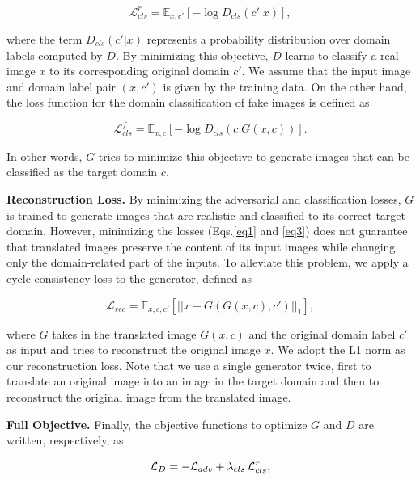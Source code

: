 \begin{equation}
\mathcal{L}_{cls}^{r} = {\mathbb{E}}_{x, c'}[-\log{{D}_{cls}(c'|x)}],
\label{eq2}
\end{equation}

where the term ${D}_{cls}(c'|x)$ represents a probability distribution over domain labels computed by $D$. By minimizing this objective, $D$ learns to classify a real image $x$ to its corresponding original domain $c'$. We assume that the input image and domain label pair $(x, c')$ is given by the training data. On the other hand, the loss function for the domain classification of fake images is defined as

\begin{equation}
\mathcal{L}_{cls}^{f} ={\mathbb{E}}_{x, c}[-\log{{D}_{cls}(c|G(x, c))}].
\label{eq3}
\end{equation}

In other words, $G$ tries to minimize this objective to generate images that can be classified as the target domain $c$. 

\medskip

 \textbf{Reconstruction Loss.} By minimizing the adversarial and classification losses, $G$ is trained to generate images that are realistic and classified to its correct target domain. However, minimizing the losses (Eqs.\thinspace\eqref{eq1} and \eqref{eq3}) does not guarantee that translated images preserve the content of its input images while changing only the domain-related part of the inputs. To alleviate this problem, we apply a cycle consistency loss \cite{kim2017learning, zhu2017unpaired} to the generator, defined as

\begin{equation}
\mathcal{L}_{rec} = {\mathbb{E}}_{x, c, c'} [{||x - G(G(x, c), c')||}_{1} ],
\label{eq4}
\end{equation}

 where $G$ takes in the translated image $G(x, c)$ and the original domain label $c'$ as input and tries to reconstruct the original image $x$. We adopt the L1 norm as our reconstruction loss. Note that we use a single generator twice, first to translate an original image into an image in the target domain and then to reconstruct the original image from the translated image. 

\medskip

 \textbf{Full Objective.} Finally, the objective functions to optimize $G$ and $D$ are written, respectively, as

\begin{equation}
\mathcal{L}_{D} =  - \mathcal {L}_{adv} +  {\lambda}_{cls}\thinspace\mathcal{L}_{cls}^{r}, 
\end{equation}

